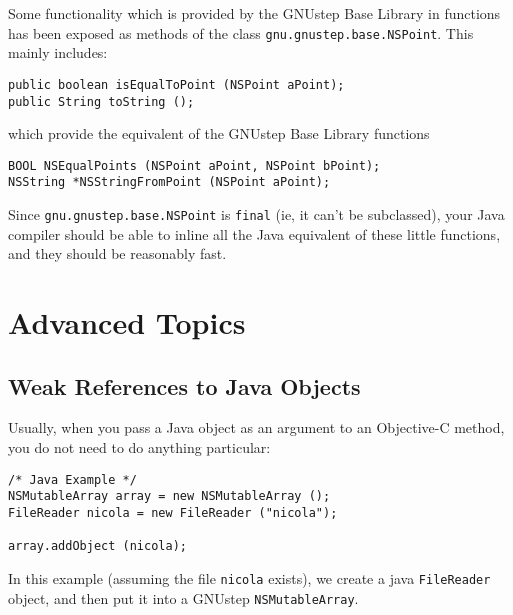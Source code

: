 Some functionality which is provided by the GNUstep Base Library in
functions has been exposed as methods of the class
\texttt{gnu.gnustep.base.NSPoint}.  This mainly includes:
\begin{verbatim}
public boolean isEqualToPoint (NSPoint aPoint);
public String toString ();
\end{verbatim}
which provide the equivalent of the GNUstep Base Library functions
\begin{verbatim}
BOOL NSEqualPoints (NSPoint aPoint, NSPoint bPoint);
NSString *NSStringFromPoint (NSPoint aPoint);
\end{verbatim}
Since \texttt{gnu.gnustep.base.NSPoint} is \texttt{final} (ie, it
can't be subclassed), your Java compiler should be able to inline all
the Java equivalent of these little functions, and they should be
reasonably fast.

\section{Advanced Topics}

\subsection{Weak References to Java Objects}

Usually, when you pass a Java object as an argument to an Objective-C 
method, you do not need to do anything particular:
\begin{verbatim}
/* Java Example */
NSMutableArray array = new NSMutableArray ();
FileReader nicola = new FileReader ("nicola");

array.addObject (nicola);
\end{verbatim}
In this example (assuming the file \texttt{nicola} exists), we create
a java \texttt{FileReader} object, and then put it into a GNUstep
\texttt{NSMutableArray}.

